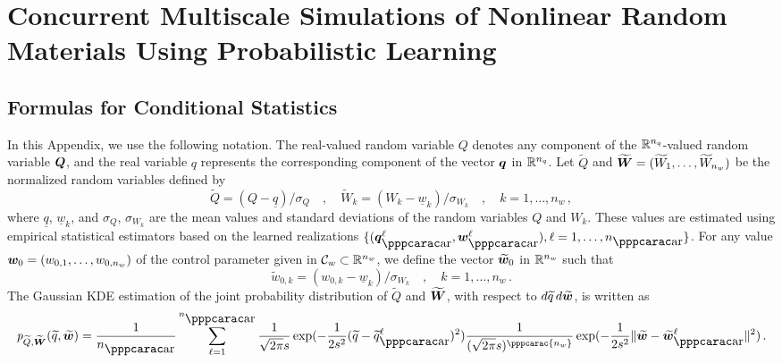 \chapter{Concurrent Multiscale Simulations of Nonlinear Random Materials Using Probabilistic Learning}

\section{Formulas for Conditional Statistics}
\label{app:fe2}

In this Appendix, we use the following notation. The real-valued random variable $Q$ denotes any component of the ${\mathbb{R}}^{n_q}$-valued random variable ${\boldsymbol{Q}}$, and the real variable $q$ represents the corresponding component of the vector ${\boldsymbol{q}}$ in ${\mathbb{R}}^{n_q}$.
%
Let $\widetilde{Q}$ and $\widetilde{{\boldsymbol{W}}} = (\widetilde{W}_{1},\ldots,\widetilde{W}_{n_w})$ be the normalized random variables defined by
%
\begin{equation}\label{eqPLoMA1}
    \widetilde{Q} = (Q - \underline{q}) /{{\sigma_{\! Q}}}\quad , \quad
    \widetilde{W}_k = (W_k - \underline{w}_k) /{{\sigma_{W_k}}} \quad , \quad k=1,\ldots, n_w \,,
\end{equation}
%
where $\underline{q}$, $\underline{w}_k$, and $\sigma_{\! Q}$, $\sigma_{W_k}$ are the mean values and standard deviations of the random variables $Q$ and $W_k$. These values are estimated using empirical statistical estimators based on the learned realizations $\{(\bfq_\ar^\ell,\bfw_\ar^\ell), \ell = 1,\ldots,n_\ar\}$.
%
For any value ${\boldsymbol{w}}_0 = (w_{0,1},\ldots , w_{0,n_w})$ of the control parameter given in ${\mathcal{C}}_w\subset{\mathbb{R}}^{n_w}$, we define the vector $\widetilde{{\boldsymbol{w}}}_0$ in ${\mathbb{R}}^{n_w}$ such that
%
\begin{equation}\label{eqPLoMA2}
 \widetilde{w}_{0,k} = (w_{0,k} - \underline{w}_k) /{\sigma_{W_k}} \quad , \quad k=1,\ldots, n_w \,.
\end{equation}
%
The Gaussian KDE estimation of the joint probability distribution of $\widetilde Q$ and $\widetilde{{\boldsymbol{W}}}$, with respect to 
$d\widetilde{q}\, d\widetilde{{\boldsymbol{w}}}$, is written as 
%
\begin{equation}\label{eqPLoMA3}
    \textit{p}_{\widetilde{Q},\widetilde{\bfW}}(\widetilde{q},\widetilde{\bfw}) 
    = \frac{1}{n_\ar}\sum_{\ell = 1}^{n_\ar} \frac{1}{\sqrt{2\pi} s} \exp({-\frac{1}{2s^2}( \widetilde{q} - \widetilde{q}^\ell_\ar )^2})
     \frac{1}{(\sqrt{2\pi}s)^{\pppcarac{n_w}}}
     \exp({-\frac{1}{2s^2}\Vert \widetilde{\bfw} - \widetilde{\bfw}^\ell_\ar \Vert^2})\, .
\end{equation}
